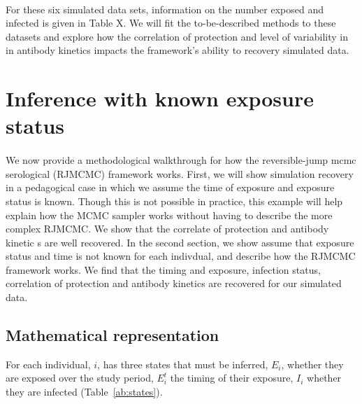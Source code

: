 \documentclass{article}
\begin{document}
\paragraph{}For these six simulated data sets, information on the number exposed and infected is given in Table X. We will fit the to-be-described methods to these datasets and explore how the correlation of protection and level of variability in in antibody kinetics impacts the framework's ability to recovery simulated data. 





\newpage
\section{Inference with known exposure status}

\paragraph{}We now provide a methodological walkthrough for how the reversible-jump mcmc serological (RJMCMC) framework works. First, we will show simulation recovery in a pedagogical case in which we assume the time of exposure and exposure status is known. Though this is not possible in practice, this example will help explain how the MCMC sampler works without having to describe the more complex RJMCMC. We show that the correlate of protection and antibody kinetic s are well recovered. In the second section, we show assume that exposure status and time is not known for each indivdual, and describe how the  RJMCMC framework works. We find that the timing and exposure, infection status, correlation of protection and antibody kinetics are recovered for our simulated data.

\subsection{Mathematical representation}

For each individual, $i$, has three states that must be inferred, $E_i$, whether they are exposed over the study period, $E_i^t$ the timing of their exposure, $I_i$ whether they are infected (Table~\ref{ab:states}).
\end{document}
